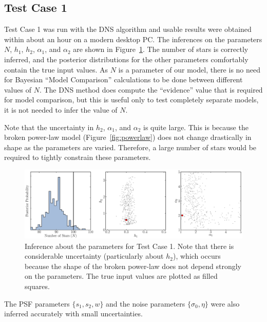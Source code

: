 \documentclass[12pt, preprint]{aastex}
\begin{document}
\subsection{Test Case 1}
Test Case 1 was run with the DNS algorithm and usable results were obtained
within about an hour on a modern desktop PC. The inferences on the parameters
$N$, $h_1$, $h_2$, $\alpha_1$, and $\alpha_2$ are shown in
Figure~\ref{fig:results1}. The number of stars is correctly inferred, and the
posterior distributions for the other parameters comfortably contain the true
input values. As $N$ is a parameter of our model, there is no need for Bayesian
``Model Comparison'' calculations to be done between different values of $N$.
The DNS method does compute the ``evidence'' value that is required for model
comparison, but this is useful only to test completely separate models, it
is not needed to infer the value of $N$.

Note that the uncertainty in $h_2$, $\alpha_1$, and $\alpha_2$ is
quite large. This is because the broken power-law model
(Figure~\ref{fig:powerlaw}) does not change drastically in shape as the
parameters are varied. Therefore, a large number of stars would be required to
tightly constrain these parameters.

\begin{figure}[ht!]
\begin{center}
\includegraphics[width=\textwidth]{Figures/inference1.eps}
\end{center}
\caption{Inference about the parameters for Test Case 1. Note that there is
considerable uncertainty (particularly about $h_2$), which occurs because the
shape of the broken power-law does not depend strongly on the parameters.
The true input values are plotted as filled squares.
\label{fig:results1}}
\end{figure}

The PSF parameters $\{s_1, s_2, w\}$ and the noise parameters $\{\sigma_0, \eta\}$
were also inferred accurately with small uncertainties.
\end{document}
